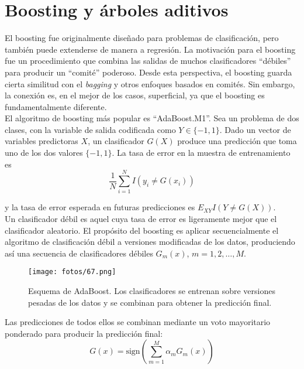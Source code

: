 \chapter{Boosting y árboles aditivos}\label{Chapter9} 


El boosting fue originalmente diseñado para problemas de clasificación, pero también puede extenderse de manera a regresión. La motivación para el boosting fue un procedimiento que combina las salidas de muchos clasificadores ``débiles'' para producir un ``comité'' poderoso. Desde esta perspectiva, el boosting guarda cierta similitud con el \textit{bagging} y otros enfoques basados en comités. Sin embargo, la conexión es, en el mejor de los casos, superficial, ya que el boosting es fundamentalmente diferente. \\

El algoritmo de boosting más popular es ``AdaBoost.M1''. Sea un problema de dos clases, con la variable de salida codificada como $Y \in \{-1, 1\}$. Dado un vector de variables predictoras $X$, un clasificador $G(X)$ produce una predicción que toma uno de los dos valores $\{-1, 1\}$. La tasa de error en la muestra de entrenamiento es
\begin{equation}
\frac{1}{N} \sum_{i=1}^{N} I(y_i \neq G(x_i))
\end{equation}

\noindent y la tasa de error esperada en futuras predicciones es $E_{XY} I(Y \neq G(X))$. \\

Un clasificador débil es aquel cuya tasa de error es ligeramente mejor que el clasificador aleatorio. El propósito del boosting es aplicar secuencialmente el algoritmo de clasificación débil a versiones modificadas de los datos, produciendo así una secuencia de clasificadores débiles $G_m(x)$, $m = 1,2,\dots,M$. \\

\begin{figure}[h]
\centering
\texttt{[image: fotos/67.png]}
\caption{Esquema de AdaBoost. Los clasificadores se entrenan sobre versiones pesadas de los datos y se combinan para obtener la predicción final.}
\label{fig:67}
\end{figure}


Las predicciones de todos ellos se combinan mediante un voto mayoritario ponderado para producir la predicción final:
\begin{equation}
G(x) = \text{sign} \left( \sum_{m=1}^{M} \alpha_m G_m(x) \right)
\label{eq_boost:10.1}
\end{equation}

